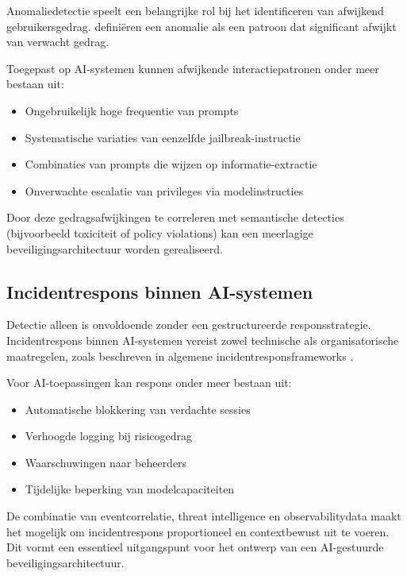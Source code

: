 Anomaliedetectie speelt een belangrijke rol bij het identificeren van afwijkend gebruikersgedrag. \textcite{chandola2009anomaly} definiëren een anomalie als een patroon dat significant afwijkt van verwacht gedrag.

Toegepast op AI-systemen kunnen afwijkende interactiepatronen onder meer bestaan uit:

\begin{itemize}
    \item Ongebruikelijk hoge frequentie van prompts
    \item Systematische variaties van eenzelfde jailbreak-instructie
    \item Combinaties van prompts die wijzen op informatie-extractie
    \item Onverwachte escalatie van privileges via modelinstructies
\end{itemize}

Door deze gedragsafwijkingen te correleren met semantische detecties (bijvoorbeeld toxiciteit of policy violations) kan een meerlagige beveiligingsarchitectuur worden gerealiseerd.

\subsection{Incidentrespons binnen AI-systemen}

Detectie alleen is onvoldoende zonder een gestructureerde responsstrategie. Incidentrespons binnen AI-systemen vereist zowel technische als organisatorische maatregelen, zoals beschreven in algemene incidentresponsframeworks \autocite{nist80061}.

Voor AI-toepassingen kan respons onder meer bestaan uit:

\begin{itemize}
    \item Automatische blokkering van verdachte sessies
    \item Verhoogde logging bij risicogedrag
    \item Waarschuwingen naar beheerders
    \item Tijdelijke beperking van modelcapaciteiten
\end{itemize}

De combinatie van eventcorrelatie, threat intelligence en observabilitydata maakt het mogelijk om incidentrespons proportioneel en contextbewust uit te voeren. Dit vormt een essentieel uitgangspunt voor het ontwerp van een AI-gestuurde beveiligingsarchitectuur.



